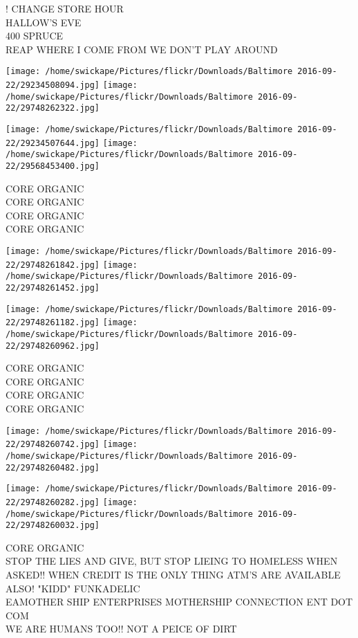 \documentclass[10pt,letterpaper]{article}
\begin{document}
! CHANGE STORE HOUR\\
HALLOW'S EVE\\
400 SPRUCE\\
REAP WHERE I COME FROM WE DON'T PLAY AROUND\\
\pagebreak

\texttt{[image: /home/swickape/Pictures/flickr/Downloads/Baltimore 2016-09-22/29234508094.jpg]}
\texttt{[image: /home/swickape/Pictures/flickr/Downloads/Baltimore 2016-09-22/29748262322.jpg]}

\texttt{[image: /home/swickape/Pictures/flickr/Downloads/Baltimore 2016-09-22/29234507644.jpg]}
\texttt{[image: /home/swickape/Pictures/flickr/Downloads/Baltimore 2016-09-22/29568453400.jpg]}

CORE ORGANIC\\
CORE ORGANIC\\
CORE ORGANIC\\
CORE ORGANIC\\
\pagebreak

\texttt{[image: /home/swickape/Pictures/flickr/Downloads/Baltimore 2016-09-22/29748261842.jpg]}
\texttt{[image: /home/swickape/Pictures/flickr/Downloads/Baltimore 2016-09-22/29748261452.jpg]}

\texttt{[image: /home/swickape/Pictures/flickr/Downloads/Baltimore 2016-09-22/29748261182.jpg]}
\texttt{[image: /home/swickape/Pictures/flickr/Downloads/Baltimore 2016-09-22/29748260962.jpg]}

CORE ORGANIC\\
CORE ORGANIC\\
CORE ORGANIC\\
CORE ORGANIC\\
\pagebreak

\texttt{[image: /home/swickape/Pictures/flickr/Downloads/Baltimore 2016-09-22/29748260742.jpg]}
\texttt{[image: /home/swickape/Pictures/flickr/Downloads/Baltimore 2016-09-22/29748260482.jpg]}

\texttt{[image: /home/swickape/Pictures/flickr/Downloads/Baltimore 2016-09-22/29748260282.jpg]}
\texttt{[image: /home/swickape/Pictures/flickr/Downloads/Baltimore 2016-09-22/29748260032.jpg]}

CORE ORGANIC\\
STOP THE LIES AND GIVE, BUT STOP LIEING TO HOMELESS WHEN ASKED!! WHEN CREDIT IS THE ONLY THING ATM'S ARE AVAILABLE ALSO! "KIDD" FUNKADELIC\\
EAMOTHER SHIP ENTERPRISES MOTHERSHIP CONNECTION ENT DOT COM\\
WE ARE HUMANS TOO!! NOT A PEICE OF DIRT\\
\pagebreak
\end{document}
